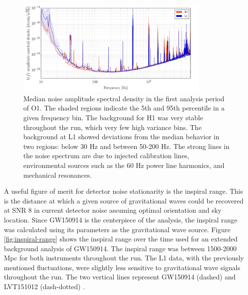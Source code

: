 \begin{figure}[ht!]%
\includegraphics[width=0.85\textwidth]{figures/O1/H1L1-OBSERVING_GW150914_PERCENTILE_SPECTRUM-1126073342-3309798}
\caption[Median noise ASD in O1]{Median noise amplitude spectral density %
         in the first analysis period of O1. The shaded regions indicate %
         the 5th and 95th percentile in a given frequency bin. The background %
         for H1 was very stable throughout the run, which very few high %
         variance bins. The background at L1 showed deviations from the %
         median behavior in two regions: below 30 Hz and between 50-200 Hz. %
         The strong lines in the noise spectrum are due to injected calibration %
         lines, environmental sources such as the 60 Hz power line harmonics, %
         and mechanical resonances.
         }
\label{fig:median-asd}
\end{figure}

A useful figure of merit for detector noise stationarity is the 
inspiral range. This is the distance at which a given source 
of gravitational waves 
could be recovered at SNR 8 in current detector noise assuming 
optimal orientation and sky location. Since GW150914 is the 
centerpiece of the analysis, the inspiral range was calculated using 
its parameters as the gravitational wave source. Figure \ref{fig:inspiral-range} 
shows 
the inspiral range over the time used for an extended background 
analysis of GW150914. The inspiral range was between 1500-2000 Mpc 
for both instruments throughout the run. The L1 data, with the 
previously mentioned fluctuations, were slightly less sensitive to 
gravitational wave signals throughout the run. The two vertical lines 
represent GW150914 (dashed) and LVT151012 (dash-dotted) \cite{GW150914-DETCHAR}.

